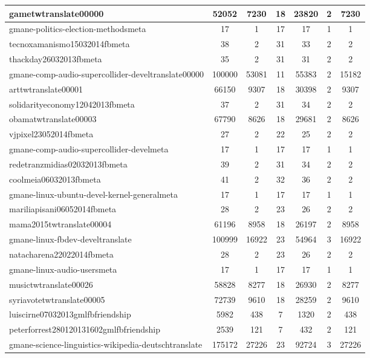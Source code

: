\begin{table*}[h!]
\begin{center}
\begin{tabular}{| l | c | c | c | c | c | c |}
gametwtranslate00000 & 52052  & 7230  & 18  & 23820  & 2  & 7230 \\\hline
gmane-politics-election-methodsmeta & 17  & 1  & 17  & 17  & 1  & 1 \\\hline
tecnoxamanismo15032014fbmeta & 38  & 2  & 31  & 33  & 2  & 2 \\\hline
thackday26032013fbmeta & 35  & 2  & 31  & 31  & 2  & 2 \\\hline
gmane-comp-audio-supercollider-develtranslate00000 & 100000  & 53081  & 11  & 55383  & 2  & 15182 \\\hline
arttwtranslate00001 & 66150  & 9307  & 18  & 30398  & 2  & 9307 \\\hline
solidarityeconomy12042013fbmeta & 37  & 2  & 31  & 34  & 2  & 2 \\\hline
obamatwtranslate00003 & 67790  & 8626  & 18  & 29681  & 2  & 8626 \\\hline
vjpixel23052014fbmeta & 27  & 2  & 22  & 25  & 2  & 2 \\\hline
gmane-comp-audio-supercollider-develmeta & 17  & 1  & 17  & 17  & 1  & 1 \\\hline
redetranzmidias02032013fbmeta & 39  & 2  & 31  & 34  & 2  & 2 \\\hline
coolmeia06032013fbmeta & 41  & 2  & 32  & 36  & 2  & 2 \\\hline
gmane-linux-ubuntu-devel-kernel-generalmeta & 17  & 1  & 17  & 17  & 1  & 1 \\\hline
mariliapisani06052014fbmeta & 28  & 2  & 23  & 26  & 2  & 2 \\\hline
mama2015twtranslate00004 & 61196  & 8958  & 18  & 26197  & 2  & 8958 \\\hline
gmane-linux-fbdev-develtranslate & 100999  & 16922  & 23  & 54964  & 3  & 16922 \\\hline
natacharena22022014fbmeta & 28  & 2  & 23  & 26  & 2  & 2 \\\hline
gmane-linux-audio-usersmeta & 17  & 1  & 17  & 17  & 1  & 1 \\\hline
musictwtranslate00026 & 58828  & 8277  & 18  & 26930  & 2  & 8277 \\\hline
syriavotetwtranslate00005 & 72739  & 9610  & 18  & 28259  & 2  & 9610 \\\hline
luiscirne07032013gmlfbfriendship & 5982  & 438  & 7  & 1320  & 2  & 438 \\\hline
peterforrest280120131602gmlfbfriendship & 2539  & 121  & 7  & 432  & 2  & 121 \\\hline
gmane-science-linguistics-wikipedia-deutschtranslate & 175172  & 27226  & 23  & 92724  & 3  & 27226 \\\hline

\end{tabular}
\end{center}
\end{table*}
